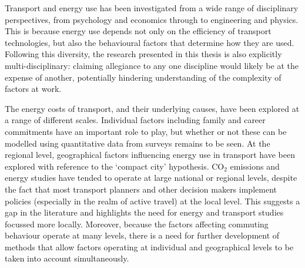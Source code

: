 Transport and energy use has been investigated from a wide range of disciplinary
perspectives, from psychology and economics through to engineering and physics.
This is because energy use depends not only on the efficiency of transport
technologies, but also the behavioural factors that determine how they are used.
Following this diversity, the research presented in this thesis is also
explicitly multi-disciplinary: claiming allegiance to any one discipline
would likely be at the expense of another, potentially 
hindering understanding of the complexity of factors at work.

The energy costs of transport, and their underlying causes, have been explored at a
range of different scales. Individual factors including family
and career commitments have an important role to play, but whether or not
these can be modelled using quantitative data from surveys remains to be seen.
At the regional level, geographical factors influencing energy use in transport
have been explored with reference to the `compact city' hypothesis. CO$_2$
emissions and energy studies have tended to operate at large national or
regional levels, despite the fact that most transport planners and other decision
makers implement policies (especially in the realm of active travel) at the
local level. This suggests a gap in the literature and highlights the need
for energy and transport studies focussed more locally. Moreover,
because the factors affecting commuting behaviour operate at many levels,
there is a need for further development of methods that allow factors operating
at individual and geographical levels to be taken into account simultaneously.








